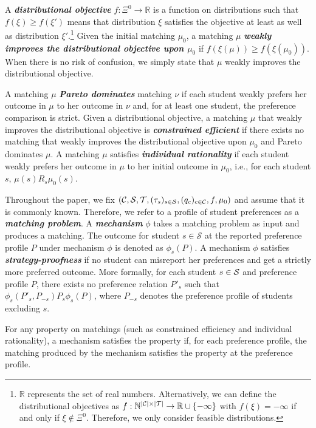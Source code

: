 \documentclass[12pt]{amsart}
\theoremstyle{remark}
\def\T{\mathcal{T}} \def\calt{\mathcal{T}}
\newcommand{\df}[1]{\textbf{\textit{#1}}}
\begin{document}
A \df{distributional objective} $f: \Xi^0 \rightarrow \mathbb{R}$ is a function on distributions such that $f(\xi) \geq f(\xi')$ means that distribution $\xi$ satisfies the objective at least as well as distribution $\xi'$.\footnote{$\mathbb{R}$ represents the set of real numbers. Alternatively, we can define the distributional objectives as
$f: \mathbb N^{|\C|\times |\T|} \rightarrow \mathbb{R} \cup \{-\infty\}$ with $f(\xi)=-\infty$ if and only if $\xi \notin \Xi^0$. Therefore, we only consider feasible distributions.}
Given the initial matching $\mu_0$, a matching $\mu$ \df{weakly improves the distributional objective upon $\mu_0$} if $f(\xi(\mu)) \geq f(\xi(\mu_0))$. When there is no risk of confusion, we simply state that $\mu$ weakly improves the distributional objective.


A matching $\mu$ \df{Pareto dominates} matching $\nu$ if each student weakly prefers her outcome in $\mu$ to her outcome in $\nu$ and,
for at least one student, the preference comparison is strict. Given a distributional objective, a matching $\mu$ that weakly improves
the distributional objective is \df{constrained efficient} if there exists no matching that weakly improves the distributional objective upon $\mu_0$ and
Pareto dominates $\mu$. A matching $\mu$ satisfies \df{individual rationality} if each student weakly prefers her outcome in $\mu$ to her
initial outcome in $\mu_0$, i.e., for each student $s$, $\mu(s)  \mathrel{R_s} \mu_0(s)$.


Throughout the paper, we fix $(\calc, \cals, \calt, (\tau_s)_{s\in \cals}, (q_c)_{c\in \calc}, f, \mu_0)$  and
assume that it is commonly known. Therefore, we refer to a profile of student preferences as a \df{matching problem}. A \df{mechanism} $\phi$ takes a matching problem as
input and produces a matching. The outcome for student $s\in \mathcal{S}$ at the reported preference
profile $P$ under mechanism $\phi$ is denoted as $\phi_s(P)$. A mechanism $\phi$ satisfies \df{strategy-proofness}
if no student can misreport her preferences and get a strictly more preferred outcome. More
formally, for each student $s\in \mathcal{S}$ and preference profile $P$, there exists no
preference relation $P'_s$ such that $\phi_s(P'_s,P_{-s}) \mathrel{P_s} \phi_s(P)$,
where $P_{-s}$ denotes the preference profile of students excluding $s$.

For any property on matchings (such as constrained efficiency and individual rationality),
a mechanism satisfies the property if, for each preference profile, the matching produced by
the mechanism satisfies the property at the preference profile.
\end{document}

